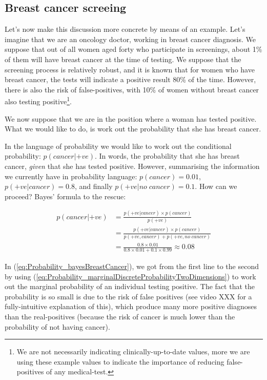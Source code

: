 \documentclass[11pt,fullpage]{book}
\begin{document}
\subsection{Breast cancer screeing}
Let's now make this discussion more concrete by means of an example. Let's imagine that we are an oncology doctor, working in breast cancer diagnosis. We suppose that out of all women aged forty who participate in screenings, about 1\% of them will have breast cancer at the time of testing. We suppose that the screening process is relatively robust, and it is known that for women who have breast cancer, the tests will indicate a positive result 80\% of the time. However, there is also the risk of false-positives, with 10\% of women without breast cancer also testing positive\footnote{We are not necessarily indicating clinically-up-to-date values, more we are using these example values to indicate the importance of reducing false-positives of any medical-test.}.

We now suppose that we are in the position where a woman has tested positive. What we would like to do, is work out the probability that she has breast cancer.

In the language of probability we would like to work out the conditional probability: $p(cancer|+ve)$. In words, the probability that she has breast cancer, \textit{given} that she has tested positive. However, summarising the information we currently have in probability language: $p(cancer)=0.01$, $p(+ve|cancer)=0.8$, and finally $p(+ve|no\; cancer) = 0.1$. How can we proceed? Bayes' formula to the rescue:

\begin{align}\label{eq:Probability_bayesBreastCancer}
p(cancer|+ve) &= \frac{p(+ve|cancer)\times p(cancer)}{p(+ve)}\\
&= \frac{p(+ve|cancer)\times p(cancer)}{p(+ve,cancer)+p(+ve,no\;cancer)}\\
&= \frac{0.8\times 0.01}{0.8\times 0.01 + 0.1\times 0.99} \approx 0.08
\end{align}

In (\ref{eq:Probability_bayesBreastCancer}), we got from the first line to the second by using (\ref{eq:Probability_marginalDiscreteProbabilityTwoDimensions}) to work out the marginal probability of an individual testing positive. The fact that the probability is so small is due to the risk of false positives (see video XXX for a fully-intuitive explanation of this), which produce many more positive diagnoses than the real-positives (because the risk of cancer is much lower than the probability of not having cancer).
\end{document}
